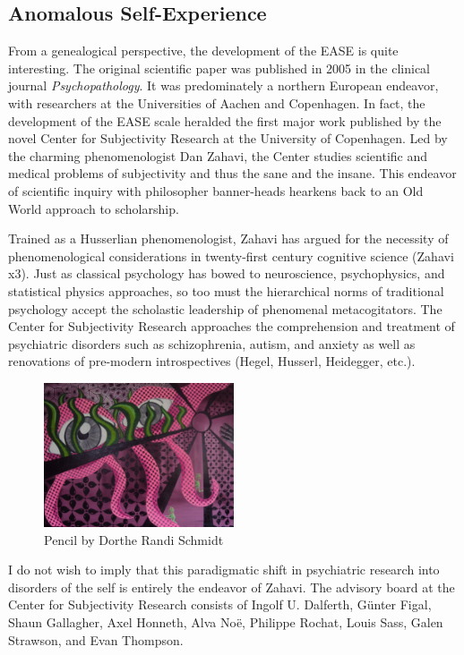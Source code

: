 \documentclass[]{article}
\begin{document}
	\subsection{Anomalous Self-Experience}
	
		From a genealogical perspective, the development of the EASE is quite interesting. The original scientific paper was published in 2005 in the clinical journal \textit{Psychopathology}. It was predominately a northern European endeavor, with researchers at the Universities of Aachen and Copenhagen. In fact, the development of the EASE scale heralded the first major work published by the novel Center for Subjectivity Research at the University of Copenhagen. Led by the charming phenomenologist Dan Zahavi, the Center studies scientific and medical problems of subjectivity and thus the sane and the insane. This endeavor of scientific inquiry with philosopher banner-heads hearkens back to an Old World approach to scholarship.
	
		Trained as a Husserlian phenomenologist, Zahavi has argued for the necessity of phenomenological considerations in twenty-first century cognitive science (Zahavi x3). Just as classical psychology has bowed to neuroscience, psychophysics, and statistical physics approaches, so too must the hierarchical norms of traditional psychology accept the scholastic leadership of phenomenal metacogitators. The Center for Subjectivity Research approaches the comprehension and treatment of psychiatric disorders such as schizophrenia, autism, and anxiety as well as renovations of pre-modern introspectives (Hegel, Husserl, Heidegger, etc.).
		
		\begin{figure}
			\centering
			\includegraphics[width=0.5\textwidth]{graphics/DortheRandiSchmidt2}
			\caption{Pencil by Dorthe Randi Schmidt}
		\end{figure}
		
		
		I do not wish to imply that this paradigmatic shift in psychiatric research into disorders of the self is entirely the endeavor of Zahavi. The advisory board at the Center for Subjectivity Research consists of Ingolf U. Dalferth, G\"{u}nter Figal, Shaun Gallagher, Axel Honneth, Alva No\"{e}, Philippe Rochat, Louis Sass, Galen Strawson, and Evan Thompson.
		
\end{document}
